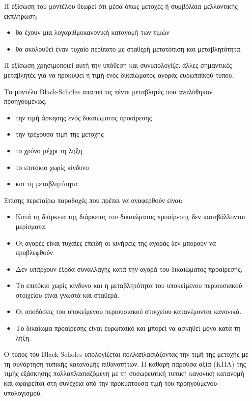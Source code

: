 H εξίσωση του μοντέλου θεωρεί ότι μέσα όπως μετοχές ή συμβόλαια μελλοντικής εκπλήρωση:
\begin{itemize}
    \item θα έχουν μια λογαριθμοκανονική κατανομή των τιμών
    \item θα ακολουθεί έναν τυχαίο περίπατο με σταθερή μετατόπιση και μεταβλητότητα.
\end{itemize}

Η εξίσωση χρησιμοποιεί αυτή την υπόθεση και συνυπολογίζει άλλες σημαντικές μεταβλητές για να προκύψει η τιμή ενός δικαιώματος αγοράς ευρωπαϊκού τύπου.

Το μοντέλο Black-Scholes απαιτεί τις πέντε μεταβλητές που αναλύθηκαν προηγουμένως:
\begin{itemize}
    \item την τιμή άσκησης ενός δικαιώματος προαίρεσης
    \item την τρέχουσα τιμή της μετοχής
    \item το χρόνο μέχρι τη λήξη
    \item το επιτόκιο χωρίς κίνδυνο
    \item και τη μεταβλητότητα.
\end{itemize}

Επίσης περεταίρω παραδοχές που πρέπει να αναφερθούν είναι:

\begin{itemize}
    \item Κατά τη διάρκεια της διάρκειας του δικαιώματος προαίρεσης δεν καταβάλλονται μερίσματα.
    \item Οι αγορές είναι τυχαίες επειδή οι κινήσεις της αγοράς δεν μπορούν να προβλεφθούν.
    \item Δεν υπάρχουν έξοδα συναλλαγής κατά την αγορά του δικαιώματος προαίρεσης.
    \item Το επιτόκιο χωρίς κίνδυνο και η μεταβλητότητα του υποκείμενου περιουσιακού στοιχείου είναι γνωστά και σταθερά.
    \item Οι αποδόσεις του υποκείμενου περιουσιακού στοιχείου κατανέμονται κανονικά.
    \item Το δικαίωμα προαίρεσης είναι ευρωπαϊκό και μπορεί να ασκηθεί μόνο κατά τη λήξη.
\end{itemize}

Ο τύπος του Black-Scholes υπολογίζεται πολλαπλασιάζοντας την τιμή της μετοχής με τη συνάρτηση τυπικής κατανομής πιθανοτήτων.
Η καθαρή παρούσα αξία (ΚΠΑ) της τιμής εξάσκησης πολλαπλασιαζόμενη με τη συσωρευτική τυπική κανονική κατανομή και αφαιρείται στη συνέχεια από την προκύπτουσα τιμή του προηγούμενου υπολογισμού.

